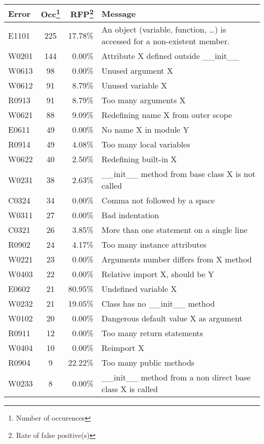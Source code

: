 \documentclass[11pt, a4paper]{article}
\begin{document}
\begin{longtable}{|l|c|r|m{9.2cm}|}
\hline
\textbf{\small{Error}} & \textbf{\small{Occ\footnote{Number of occurences}}} & \textbf{\small{RFP\footnote{Rate of false positive(s)}}} & \textbf{\small{Message}} \\
\hline
\hline
E1101 & 225 & 17.78\% & An object (variable, function, \dots) is accessed for a non-existent member. \\
\hline
W0201 & 144 & 0.00\% & Attribute X defined outside \_\_init\_\_ \\
\hline
W0613 & 98 & 0.00\% & Unused argument X \\
\hline
W0612 & 91 & 8.79\% & Unused variable X \\
\hline
R0913 & 91 & 8.79\% & Too many arguments X \\
\hline
W0621 & 88 & 9.09\% & Redefining name X from outer scope \\
\hline
E0611 & 49 & 0.00\% & No name X in module Y \\
\hline
R0914 & 49 & 4.08\% & Too many local variables \\
\hline
W0622 & 40 & 2.50\% & Redefining built-in X \\
\hline
W0231 & 38 & 2.63\% & \_\_init\_\_ method from base class X is not called \\
\hline
C0324 & 34 & 0.00\% & Comma not followed by a space \\
\hline
W0311 & 27 & 0.00\% & Bad indentation \\
\hline
C0321 & 26 & 3.85\% & More than one statement on a single line \\
\hline
R0902 & 24 & 4.17\% & Too many instance attributes \\
\hline
W0221 & 23 & 0.00\% & Arguments number differs from X method \\
\hline
W0403 & 22 & 0.00\% & Relative import X, should be Y \\
\hline
E0602 & 21 & 80.95\% & Undefined variable X \\
\hline
W0232 & 21 & 19.05\% & Class has no \_\_init\_\_ method \\
\hline
W0102 & 20 & 0.00\% & Dangerous default value X as argument \\
\hline
R0911 & 12 & 0.00\% & Too many return statements \\
\hline
W0404 & 10 & 0.00\% & Reimport X \\
\hline
R0904 & 9 & 22.22\% & Too many public methods \\
\hline
W0233 & 8 & 0.00\% & \_\_init\_\_ method from a non direct base class X is called \\

\end{longtable}
\end{document}

